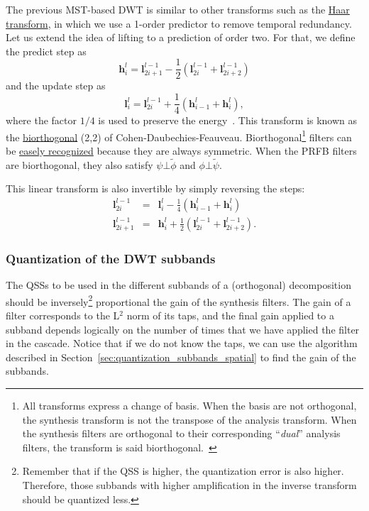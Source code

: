 The previous MST-based DWT is similar to other transforms such as the
\href{https://en.wikipedia.org/wiki/Haar_wavelet}{Haar transform}, in
which we use a 1-order predictor to remove temporal
redundancy. Let us extend the idea of lifting to a prediction of order
two. For that, we define the predict step as
\begin{equation}
  {\mathbf h}^l_i = {\mathbf l}^{l-1}_{2i+1} - \frac{1}{2}({\mathbf l}^{l-1}_{2i} + {\mathbf l}^{l-1}_{2i+2})
\end{equation}
and the update step as
\begin{equation}
  {\mathbf l}^l_i = {\mathbf l}^{l-1}_{2i} + \frac{1}{4}({\mathbf h}^l_{i-1} + {\mathbf h}^l_i),
\end{equation}
where the factor $1/4$ is used to preserve the
energy~\cite{sweldens1997building}. This transform is known as the
\href{https://en.wikipedia.org/wiki/Biorthogonal_wavelet}{biorthogonal}
(2,2) of Cohen-Daubechies-Feauveau.  Biorthogonal\footnote{All
  transforms express a change of basis. When the basis are not
  orthogonal, the synthesis transform is not the transpose of the
  analysis transform. When the synthesis filters are orthogonal to
  their corresponding ``\emph{dual}'' analysis filters, the transform is
  said biorthogonal.~\cite{vetterli2014foundations}} filters can be
\href{http://wavelets.pybytes.com/}{easely recognized} because they
are always symmetric. When the PRFB filters are biorthogonal,
they also satisfy $\psi\bot\tilde\phi$ and
$\phi\bot\tilde\psi$.

This linear transform is also invertible by simply reversing the steps:
\begin{equation}
  \begin{array}{rcl}
    {\mathbf l}^{l-1}_{2i} & = & {\mathbf l}^l_i - \frac{1}{4}({\mathbf h}^l_{i-1} + {\mathbf h}^l_i)\\
    {\mathbf l}^{l-1}_{2i+1} & = & {\mathbf h}^l_i + \frac{1}{2}({\mathbf l}^{l-1}_{2i} + {\mathbf l}^{l-1}_{2i+2}).
  \end{array}
\end{equation}


\subsubsection{Quantization of the DWT subbands}

The QSSs to be used in the different subbands of a (orthogonal)
decomposition should be inversely\footnote{Remember that if the QSS is
  higher, the quantization error is also higher. Therefore, those
  subbands with higher amplification in the inverse transform should
  be quantized less.} proportional the gain of the synthesis
filters. The gain of a filter corresponds to the L$^2$ norm of its
taps, and the final gain applied to a subband depends logically on the
number of times that we have applied the filter in the cascade. Notice
that if we do not know the taps, we can use the algorithm described in Section~\ref{sec:quantization_subbands_spatial} to find the gain
of the subbands.

